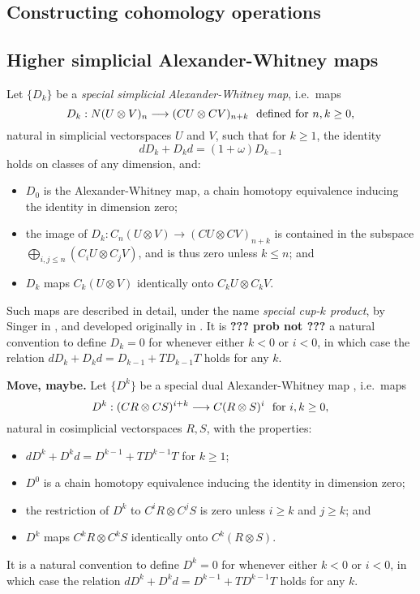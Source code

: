 \documentclass[11pt]{amsart}
\theoremstyle{plain}
\theoremstyle{definition}
\renewcommand{\to}{\longrightarrow}
\theoremstyle{plain}
\newcommand{\twist}{\omega}
\begin{document}
\begin{Constructing (co)homotopy operations}
\section{\textbf{Constructing cohomology operations}}\label{sec:Constructing cohomology operations}

\subsection{Higher simplicial Alexander-Whitney maps}
Let $\{D_k\}$ be a \emph{special simplicial Alexander-Whitney map},  i.e.\  maps
\[D_k:N(U\otimes V)_{n}\to (CU\otimes CV)_{n+k}\textup{\ \ defined for $n,k\geq0$},\]
natural in simplicial vectorspaces $U$ and $V$, such that for $k\geq1$, the identity
\[dD_k+D_kd=(1+\twist) D_{k-1}
\]
holds on classes of any dimension, and:
\begin{itemize}
\setlength{\parindent}{.25in}
\item $D_0$ is the Alexander-Whitney map, a chain homotopy equivalence inducing the identity in dimension zero;
\item the image  of $D_k:C_n(U\otimes V)\to (CU\otimes CV)_{n+k}$ is contained in the subspace
$\textstyle\bigoplus_{i,j\leq n}(C_iU\otimes C_jV)$, and is thus zero unless $k\leq n$; and
\item $D_k$ maps $C_{k}(U\otimes V)$ identically onto $C_{k}U\otimes C_{k}V$.
\end{itemize}
Such maps are described in detail, under the name \emph{special cup-$k$ product}, by Singer in \cite[Definitions 1.91 and 1.94]{MR2245560}, and developed originally in \cite{DoldUber}.
It is \textbf{??? prob not ???} a natural convention to define $D_k=0$ for whenever either $k<0$ or $i<0$, in which case the relation $dD_k+D_kd=D_{k-1}+TD_{k-1}T$ holds for any $k$.

\begin{shaded}
\textbf{Move, maybe.}
Let $\{D^k\}$ be a special dual Alexander-Whitney map \cite[Proposition 5.2]{turner_opns_and_sseqs_I.pdf}, i.e.\  maps
\[D^k:(CR\otimes CS)^{i+k}\to C(R\otimes S)^{i}\textup{\ \ for $i,k\geq0$},\]
natural in cosimplicial vectorspaces $R,S$,
with the properties:
\begin{itemize}
\setlength{\parindent}{.25in}
\item $dD^k+D^kd=D^{k-1}+TD^{k-1}T$ for $k\geq1$;
\item $D^0$ is a chain homotopy equivalence inducing the identity in dimension zero;
\item the restriction of $D^k$ to $C^{i}R\otimes C^{j}S$ is zero unless $i\geq k$ and $j\geq k$; and
\item $D^k$ maps $C^{k}R\otimes C^{k}S$ identically onto $C^{k}(R\otimes S)$.
\end{itemize}
It is a natural convention to define $D^k=0$ for whenever either $k<0$ or $i<0$, in which case the relation $dD^k+D^kd=D^{k-1}+TD^{k-1}T$ holds for any $k$.
\end{shaded}


\end{Constructing (co)homotopy operations}
\end{document}
